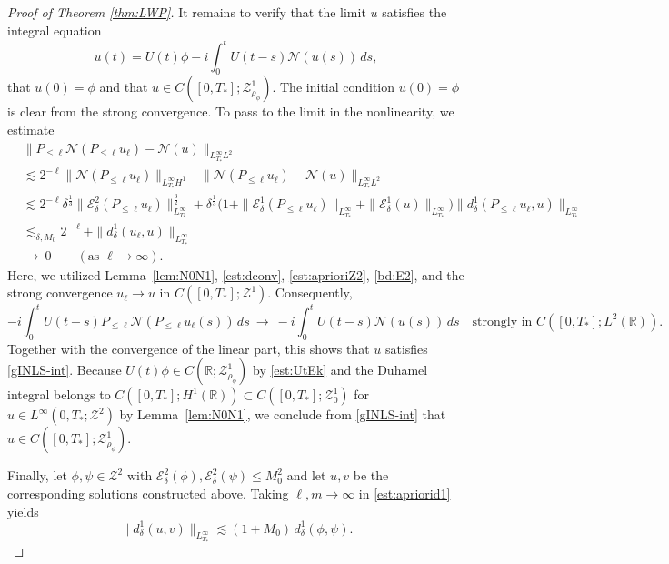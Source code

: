 \documentclass{amsart}
\numberwithin{equation}{section}
\newcommand{\R}{\mathbb{R}}
\begin{document}
\begin{proof}[Proof of Theorem \ref{thm:LWP}]
\medskip
It remains to verify that the limit \(u\) satisfies the integral equation
\begin{equation}\label{gINLS-int}
u(t)=U(t)\phi -i\int_0^tU(t-s)\mathcal{N}(u(s))\,ds,
\end{equation}
that \(u(0)=\phi\)  and that \(u\in C([0,T_*];\mathcal{Z}^1_{\rho_\phi})\).
The initial condition $u(0)=\phi$ is clear from the strong convergence.
To pass to the limit in the nonlinearity, we estimate
\begin{align*}
&\| P_{\leq \ell}\mathcal{N}(P_{\leq \ell}u_\ell)-\mathcal{N}(u)\|_{L^\infty_{T_*}L^2}\\
&\lesssim 2^{-\ell}\| \mathcal{N}(P_{\leq \ell}u_\ell)\|_{L^\infty_{T_*}H^1}+\| \mathcal{N}(P_{\leq \ell}u_\ell)-\mathcal{N}(u)\|_{L^\infty_{T_*}L^2} \\
&\lesssim 2^{-\ell}\delta^{\frac13}\| \mathcal{E}^2_\delta(P_{\leq \ell}u_\ell)\|_{L^\infty_{T_*}}^{\frac32}+\delta^{\frac13}\Big( 1+\| \mathcal{E}^1_\delta(P_{\leq \ell}u_\ell)\|_{L^\infty_{T_*}}+\| \mathcal{E}^1_\delta(u)\|_{L^\infty_{T_*}}\Big) \| d^1_\delta(P_{\leq \ell}u_\ell,u)\|_{L^\infty_{T_*}} \\
&\lesssim_{\delta,M_0} 2^{-\ell}+\| d^1_\delta(u_\ell,u)\|_{L^\infty_{T_*}} \\
&\to \ 0\qquad (\text{as } \ell\to \infty).
\end{align*}
Here, we utilized Lemma~\ref{lem:N0N1}, \eqref{est:dconv}, \eqref{est:aprioriZ2}, \eqref{bd:E2}, and the strong convergence $u_\ell\to u$ in $C([0,T_*];\mathcal{Z}^1)$. Consequently,
\[ -i\int_0^t U(t-s)P_{\leq \ell}\mathcal{N}(P_{\leq \ell}u_\ell(s))\,ds\ \to \ -i\int_0^t U(t-s)\mathcal{N}(u(s))\,ds \quad\text{strongly in } C([0,T_*];L^2(\R)). \]
Together with the convergence of the linear part, this shows that \(u\) satisfies \eqref{gINLS-int}.
Because \(U(t)\phi\in C(\R;\mathcal{Z}^1_{\rho_\phi})\) by \eqref{est:UtEk} and the Duhamel integral belongs to \(C([0,T_*];H^1(\R))\subset C([0,T_*];\mathcal{Z}^1_0)\) for \(u\in L^\infty(0,T_*;\mathcal{Z}^2)\) by Lemma~\ref{lem:N0N1}, we conclude from \eqref{gINLS-int} that \(u\in C([0,T_*];\mathcal{Z}^1_{\rho_\phi})\).

\medskip
Finally, let \(\phi,\psi\in \mathcal{Z}^2\) with \(\mathcal{E}^2_\delta(\phi), \mathcal{E}^2_\delta(\psi)\leq M_0^2\) and let \(u,v\) be the corresponding solutions constructed above.
Taking \(\ell,m\to \infty\) in \eqref{est:apriorid1} yields 
\begin{equation}\label{bd:d1}
\big\| d^1_\delta(u,v)\big\|_{L^\infty_{T_*}}\lesssim (1+M_0)\,d^1_\delta(\phi,\psi).
\end{equation}



\end{proof}
\end{document}
